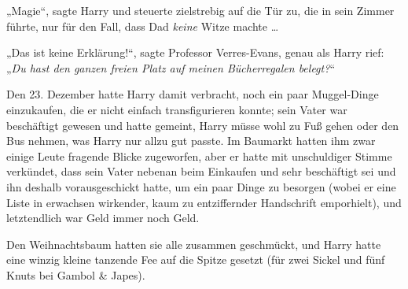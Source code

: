 „Magie“, sagte Harry und steuerte zielstrebig auf die Tür zu, die in sein Zimmer führte, nur für den Fall, dass Dad \emph{keine} Witze machte …

„Das ist keine Erklärung!“, sagte Professor Verres-Evans, genau als Harry rief:
„\emph{Du hast den ganzen freien Platz auf meinen Bücherregalen belegt?}“

\later

Den 23. Dezember hatte Harry damit verbracht, noch ein paar Muggel-Dinge einzukaufen, die er nicht einfach transfigurieren konnte; sein Vater war beschäftigt gewesen und hatte gemeint, Harry müsse wohl zu Fuß gehen oder den Bus nehmen, was Harry nur allzu gut passte. Im Baumarkt hatten ihm zwar einige Leute fragende Blicke zugeworfen, aber er hatte mit unschuldiger Stimme verkündet, dass sein Vater nebenan beim Einkaufen und sehr beschäftigt sei und ihn deshalb vorausgeschickt hatte, um ein paar Dinge zu besorgen (wobei er eine Liste in erwachsen wirkender, kaum zu entziffernder Handschrift emporhielt), und letztendlich war Geld immer noch Geld.

Den Weihnachtsbaum hatten sie alle zusammen geschmückt, und Harry hatte eine winzig kleine tanzende Fee auf die Spitze gesetzt (für zwei Sickel und fünf Knuts bei Gambol \& Japes).

